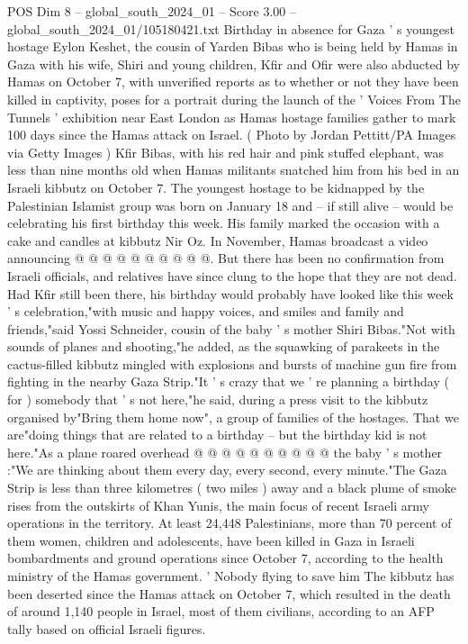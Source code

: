 \begin{textsample}{POS Dim 8 – global\_south\_2024\_01 – Score 3.00 – global\_south\_2024\_01/105180421.txt}  \label{ex:f8_pos_396}
Birthday in absence for Gaza ' s youngest hostage Eylon Keshet, the cousin of Yarden Bibas who is being held by Hamas in Gaza with his wife, Shiri and young children, Kfir and Ofir were also abducted by Hamas on October 7, with unverified reports as to whether or not they have been killed in captivity, poses for a portrait during the launch of the ' Voices From The Tunnels ' exhibition near East London as Hamas hostage families gather to mark 100 days since the Hamas attack on Israel. ( Photo by Jordan Pettitt/PA Images via Getty Images ) Kfir Bibas, with his red hair and pink stuffed elephant, was less than nine months old when Hamas militants snatched him from his bed in an Israeli kibbutz on October 7.
The youngest hostage to be kidnapped by the Palestinian Islamist group was born on January 18 and -- if still alive -- would be celebrating his first birthday this week.
His family marked the occasion with a cake and candles at kibbutz Nir Oz.
In November, Hamas broadcast a video announcing @ @ @ @ @ @ @ @ @ @.
But there has been no confirmation from Israeli officials, and relatives have since clung to the hope that they are not dead.
Had Kfir still been there, his birthday would probably have looked like this week ' s celebration,"with music and happy voices, and smiles and family and friends,"said Yossi Schneider, cousin of the baby ' s mother Shiri Bibas."Not with sounds of planes and shooting,"he added, as the squawking of parakeets in the cactus-filled kibbutz mingled with explosions and bursts of machine gun fire from fighting in the nearby Gaza Strip."It ' s crazy that we ' re planning a birthday ( for ) somebody that ' s not here,"he said, during a press visit to the kibbutz organised by"Bring them home now", a group of families of the hostages.
That we are"doing things that are related to a birthday -- but the birthday kid is not here."As a plane roared overhead @ @ @ @ @ @ @ @ @ @ the baby ' s mother :"We are thinking about them every day, every second, every minute."The Gaza Strip is less than three kilometres ( two miles ) away and a black plume of smoke rises from the outskirts of Khan Yunis, the main focus of recent Israeli army operations in the territory.
At least 24,448 Palestinians, more than 70 percent of them women, children and adolescents, have been killed in Gaza in Israeli bombardments and ground operations since October 7, according to the health ministry of the Hamas government. ' Nobody flying to save him The kibbutz has been deserted since the Hamas attack on October 7, which resulted in the death of around 1,140 people in Israel, most of them civilians, according to an AFP tally based on official Israeli figures.

\end{textsample}
